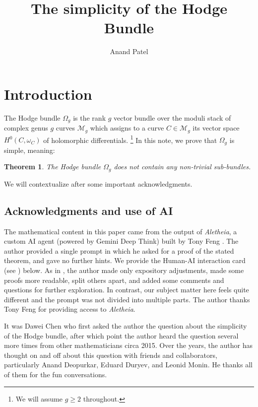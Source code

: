 \documentclass[reqno]{amsart}
\title{The simplicity of the Hodge Bundle}
\author{Anand Patel}
\theoremstyle{plain}
\newtheorem{theorem}{Theorem}[section]
\newcommand{\Aletheia}{\emph{Aletheia}}
\newcommand{\M}{\mathscr{M}}
\begin{document}
\maketitle

\section{Introduction}


The Hodge bundle $\Omega_{g}$ is the rank $g$ vector bundle
over the moduli stack of complex genus $g$ curves $\M_{g}$  which assigns to a
curve $C \in \M_{g}$ its
vector space $H^{0}(C,\omega_{C})$ of holomorphic differentials.  \footnote{We will assume
$g \geq 2$ throughout.} In this note,
we prove that $\Omega_{g}$ is simple, meaning:

\begin{theorem}
  \label{theorem:main} The Hodge bundle $\Omega_{g}$ does not contain any
  non-trivial sub-bundles.
\end{theorem} 

 
We will contextualize  after some
important acknowledgments.


\subsection{Acknowledgments and use of AI} The mathematical content in this paper came from
the output of \Aletheia, a custom AI agent (powered by Gemini Deep Think) built by Tony Feng \cite{feng2026towards}.  The author provided a
single prompt in which he asked for a proof of the stated theorem, and gave
no further hints. We provide the Human-AI interaction card (see \cite{feng2026towards}) below. As in
\cite{feng2026eigenweights},  the author made only expository adjustments, made
some proofs more readable, split others apart, and added some comments and questions
for further exploration.  In contrast, our subject matter here feels quite different and the prompt was not divided into multiple parts.  The author thanks Tony Feng for providing access to \Aletheia. 

It was Dawei Chen who first asked the author the
question about the simplicity of the Hodge bundle, after which point the author heard the
question several more times from other mathematicians circa 2015. Over the
years, the author has thought on and off about this question with friends and collaborators, particularly Anand Deopurkar, Eduard
Duryev, and Leonid Monin.  He thanks all of them for the fun conversations.  
\end{document}

